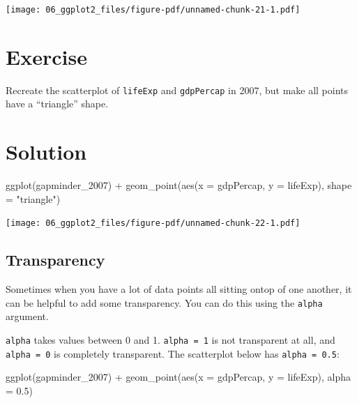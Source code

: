 \documentclass[
  letterpaper,
  DIV=11,
  numbers=noendperiod]{scrreprt}
\newenvironment{Shaded}{\begin{snugshade}}{\end{snugshade}}
\newcommand{\AttributeTok}[1]{\textcolor[rgb]{0.40,0.45,0.13}{#1}}
\newcommand{\FloatTok}[1]{\textcolor[rgb]{0.68,0.00,0.00}{#1}}
\newcommand{\FunctionTok}[1]{\textcolor[rgb]{0.28,0.35,0.67}{#1}}
\newcommand{\NormalTok}[1]{\textcolor[rgb]{0.00,0.23,0.31}{#1}}
\newcommand{\SpecialCharTok}[1]{\textcolor[rgb]{0.37,0.37,0.37}{#1}}
\newcommand{\StringTok}[1]{\textcolor[rgb]{0.13,0.47,0.30}{#1}}
\begin{document}
\texttt{[image: 06\_ggplot2\_files/figure-pdf/unnamed-chunk-21-1.pdf]}

\section{Exercise}

Recreate the scatterplot of \texttt{lifeExp} and \texttt{gdpPercap} in
2007, but make all points have a ``triangle'' shape.

\section{Solution}

\begin{Shaded}
\begin{Highlighting}[]
\FunctionTok{ggplot}\NormalTok{(gapminder\_2007) }\SpecialCharTok{+} 
  \FunctionTok{geom\_point}\NormalTok{(}\FunctionTok{aes}\NormalTok{(}\AttributeTok{x =}\NormalTok{ gdpPercap, }
                 \AttributeTok{y =}\NormalTok{ lifeExp), }
             \AttributeTok{shape =} \StringTok{"triangle"}\NormalTok{)}
\end{Highlighting}
\end{Shaded}

\texttt{[image: 06\_ggplot2\_files/figure-pdf/unnamed-chunk-22-1.pdf]}

\subsection{Transparency}\label{transparency}

Sometimes when you have a lot of data points all sitting ontop of one
another, it can be helpful to add some transparency. You can do this
using the \texttt{alpha} argument.

\texttt{alpha} takes values between 0 and 1. \texttt{alpha\ =\ 1} is not
transparent at all, and \texttt{alpha\ =\ 0} is completely transparent.
The scatterplot below has \texttt{alpha\ =\ 0.5}:

\begin{Shaded}
\begin{Highlighting}[]
\FunctionTok{ggplot}\NormalTok{(gapminder\_2007) }\SpecialCharTok{+} 
  \FunctionTok{geom\_point}\NormalTok{(}\FunctionTok{aes}\NormalTok{(}\AttributeTok{x =}\NormalTok{ gdpPercap, }\AttributeTok{y =}\NormalTok{ lifeExp), }
             \AttributeTok{alpha =} \FloatTok{0.5}\NormalTok{)}
\end{Highlighting}
\end{Shaded}
\end{document}
